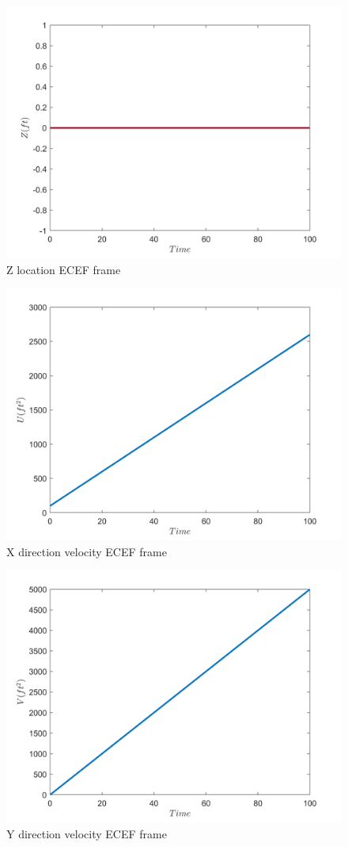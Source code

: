 \begin{figure}[H]
	\caption{Z location ECEF frame}
	\centering
	\includegraphics[width=12cm]{Q1/figures/Z location.png}
\end{figure}
\begin{figure}[H]
	\caption{X direction velocity ECEF frame}
	\centering
	\includegraphics[width=12cm]{Q1/figures/X velocity.png}
\end{figure}
\begin{figure}[H]
	\caption{Y direction velocity ECEF frame}
	\centering
	\includegraphics[width=12cm]{Q1/figures/Y velocity.png}
\end{figure}
